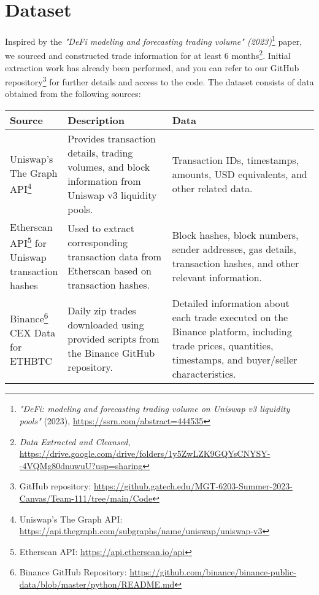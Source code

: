 \documentclass{article}
\begin{document}
{\section*{Dataset}

Inspired by the \textit{"DeFi modeling and forecasting trading volume" (2023)}\footnote{\textit{"DeFi: modeling and forecasting trading volume on Uniswap v3 liquidity pools"} (2023), \url{https://ssrn.com/abstract=444535}} paper, we sourced and constructed trade information for at least 6 months\footnote{\textit{Data Extracted and Cleansed}, \url{https://drive.google.com/drive/folders/1y5ZwLZK9GQYsCNYSY--4VQMg80dnuwuU?usp=sharing}}. Initial extraction work has already been performed, and you can refer to our GitHub repository\footnote{GitHub repository: \url{https://github.gatech.edu/MGT-6203-Summer-2023-Canvas/Team-111/tree/main/Code}} for further details and access to the code. The dataset consists of data obtained from the following sources:

\begin{center}
\small
\begin{tabular}{|p{0.15\linewidth}|p{0.35\linewidth}|p{0.5\linewidth}|}
\hline
\textbf{Source} & \textbf{Description} & \textbf{Data} \\
\hline
Uniswap's The Graph API\footnote{Uniswap's The Graph API: \url{https://api.thegraph.com/subgraphs/name/uniswap/uniswap-v3}} & Provides transaction details, trading volumes, and block information from Uniswap v3 liquidity pools. & Transaction IDs, timestamps, amounts, USD equivalents, and other related data. \\
\hline
Etherscan API\footnote{Etherscan API: \url{https://api.etherscan.io/api}} for Uniswap transaction hashes & Used to extract corresponding transaction data from Etherscan based on transaction hashes. & Block hashes, block numbers, sender addresses, gas details, transaction hashes, and other relevant information. \\
\hline
Binance\footnote{Binance GitHub Repository: \url{https://github.com/binance/binance-public-data/blob/master/python/README.md}} CEX Data for ETHBTC & Daily zip trades downloaded using provided scripts from the Binance GitHub repository. & Detailed information about each trade executed on the Binance platform, including trade prices, quantities, timestamps, and buyer/seller characteristics. \\
\hline
\end{tabular}
\end{center}


}
\end{document}
